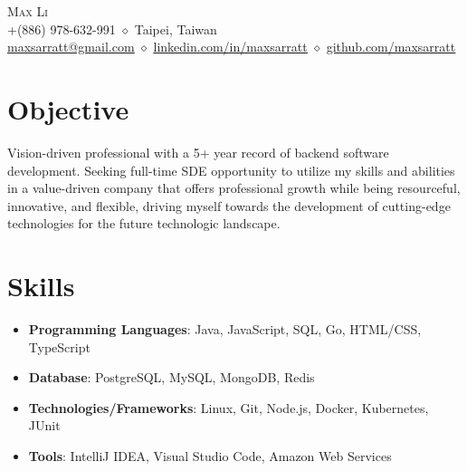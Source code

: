 \documentclass[letterpaper,11pt]{article}
\newcommand{\resumeItemTwo}[2]{
  \item{
    \textbf{#1}{: \small #2 \vspace{-2pt}}
  }
}
\newcommand{\resumeSubItem}[2]{\resumeItemTwo{#1}{#2}\vspace{-4pt}}
\newcommand{\resumeSubHeadingListStart}{\begin{itemize}[leftmargin=0.0in, label={}]}
\newcommand{\resumeSubHeadingListEnd}{\end{itemize}}
\begin{document}
\begin{center}
    {\Huge \scshape Max Li} \\ \vspace{4pt}
    +(886) 978-632-991 {$\diamond$} Taipei, Taiwan \\ \vspace{4pt} \href{mailto:maxsarratt@gmail.com}{\underline{maxsarratt@gmail.com}} {$\diamond$} \href{https://www.linkedin.com/in/maxsarratt/}{\underline{linkedin.com/in/maxsarratt}} {$\diamond$} \href{https://github.com/maxsarratt}{\underline{github.com/maxsarratt}}
    \vspace{-8pt}
\end{center}

\section{Objective}
  \begin{flushleft}
    {Vision-driven professional with a 5+ year record of backend software development. Seeking full-time SDE opportunity to utilize my skills and abilities in a value-driven company that offers professional growth while being resourceful, innovative, and flexible, driving myself towards the development of cutting-edge technologies for the future technologic landscape.}
  \end{flushleft}
  
\section{Skills}
  \resumeSubHeadingListStart
    \resumeSubItem{Programming Languages}
      {Java, JavaScript, SQL, Go, HTML/CSS, TypeScript}
    \resumeSubItem{Database}
      {PostgreSQL, MySQL, MongoDB, Redis}
    \resumeSubItem{Technologies/Frameworks}
      {Linux, Git, Node.js, Docker, Kubernetes, JUnit}
      \resumeSubItem{Tools}
        {IntelliJ IDEA, Visual Studio Code, Amazon Web Services}
  \resumeSubHeadingListEnd
\end{document}

